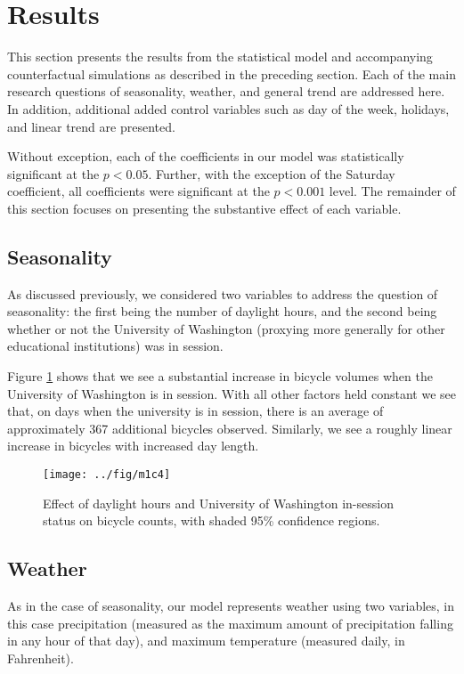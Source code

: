 \documentclass[12pt,letterpaper,article,twocolumn]{memoir}
\begin{document}
\section*{Results}
% 
% 
This section presents the results from the statistical model and
accompanying counterfactual simulations as described in the preceding
section. Each of the main research questions of seasonality, weather,
and general trend are addressed here. In addition, additional added
control variables such as day of the week, holidays, and linear trend
are presented.

Without exception, each of the coefficients in our model was
statistically significant at the $p < 0.05$. Further, with the
exception of the Saturday coefficient, all coefficients were
significant at the $p < 0.001$ level. The remainder of this section
focuses on presenting the substantive effect of each variable.

\subsection*{Seasonality}
As discussed previously, we considered two variables to address the
question of seasonality: the first being the number of daylight hours,
and the second being whether or not the University of Washington
(proxying more generally for other educational institutions) was in
session.

Figure \ref{fg:seasonality} shows that we see a substantial increase
in bicycle volumes when the University of Washington is in session.
With all other factors held constant we see that, on days when the
university is in session, there is an average of approximately 367
additional bicycles observed. Similarly, we see a roughly linear
increase in bicycles with increased day length.

\begin{figure}[htbp!]
  \centering
  \texttt{[image: ../fig/m1c4]}
  \caption{Effect of daylight hours and University of Washington
    in-session status on bicycle counts, with shaded 95\% confidence
    regions.}
  \label{fg:seasonality}
\end{figure}

\FloatBarrier
\subsection*{Weather}
As in the case of seasonality, our model represents weather using two
variables, in this case precipitation (measured as the maximum amount
of precipitation falling in any hour of that day), and maximum
temperature (measured daily, in Fahrenheit).
\end{document}
